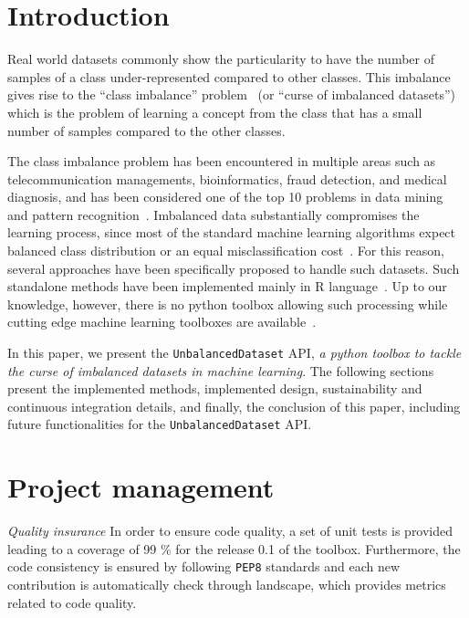 \documentclass[twoside,11pt]{article}
\begin{document}
\section{Introduction}

Real world datasets commonly show the particularity to have the number of samples of a class under-represented compared to other classes.
This imbalance gives rise to the ``class imbalance'' problem~\citep{prati2009data} (or ``curse of imbalanced datasets'')
which is the problem of learning a concept from the class that has a small number of samples compared
to the other classes. 

The class imbalance problem has been encountered in multiple areas such as 
telecommunication managements, bioinformatics, fraud detection, and medical diagnosis,
and has been considered one of the top 10 problems in data mining and 
pattern recognition~\citep{rastgoo2016tackling,yang200610}. 
Imbalanced data substantially compromises the learning process, since most of the 
standard machine learning algorithms expect balanced class distribution or an 
equal misclassification cost~\citep{he2009learning}. For this reason, several
approaches have been specifically proposed to handle such datasets.
Such standalone methods have been implemented mainly in R language~\citep{torgo2010data,kuhn2015caret,dal2013racing}.
Up to our knowledge, however, there is no python toolbox allowing such processing while cutting edge machine learning toolboxes are available~\citep{pedregosa2011scikit,sonnenburg2010shogun}.

In this paper, we present the \texttt{UnbalancedDataset} API, 
\textit{a python toolbox to tackle the curse of imbalanced datasets
in machine learning}. The following sections present the implemented
methods, implemented design, sustainability and continuous integration details,
and finally, the conclusion of this paper, including future functionalities
for the \texttt{UnbalancedDataset} API.

\section{Project management}

\noindent\textit{Quality insurance} In order to ensure code quality, a set of unit tests is provided leading to a coverage of 99 \% for the release 0.1 of the toolbox.
Furthermore, the code consistency is ensured by following \texttt{PEP8} standards and each new contribution is automatically check through landscape, which provides metrics related to code quality.
\end{document}
